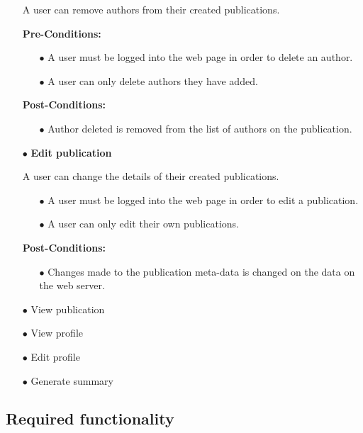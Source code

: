 \documentclass[a4paper,12pt]{article}
\begin{document}
\begin{itemize}
	 A user can remove authors from their created publications.

	\textbf{Pre-Conditions:}
	\begin{itemize}
		\item[$\bullet$]A user must be logged into the web page in order to delete an author.
		\item[$\bullet$]A user can only delete authors they have added.
		\\
	\end{itemize}
	\textbf{Post-Conditions: }
	\begin{itemize}
		\item[$\bullet$]Author deleted is removed from the list of authors on the publication.
		\\
	\end{itemize}
	\item[$\bullet$]\textbf{Edit publication}

	A user can change the details of their created publications.

	\begin{itemize}
		\item[$\bullet$]A user must be logged into the web page in order to edit a publication.
		\item[$\bullet$]A user can only edit their own publications.
		\\
	\end{itemize}
	\textbf{Post-Conditions: }
	\begin{itemize}
		\item[$\bullet$]Changes made to the publication meta-data is changed on the data on the web server.
		\\
	\end{itemize}
	\item[$\bullet$]View publication
	\item[$\bullet$]View profile
	\item[$\bullet$]Edit profile
	\item[$\bullet$]Generate summary
	\\
\end{itemize}
\subsection{Required functionality}
\end{document}
